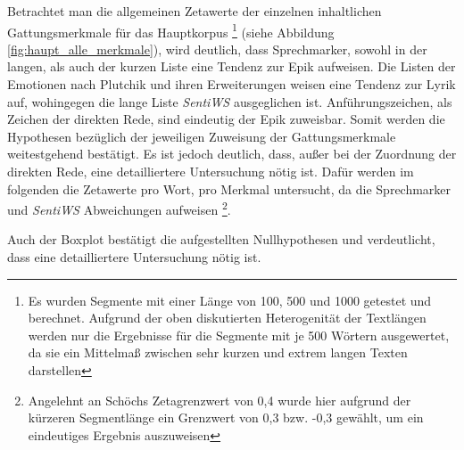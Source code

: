 \documentclass[a4paper,10p]{article}
\begin{document}
Betrachtet man die allgemeinen Zetawerte der einzelnen inhaltlichen Gattungsmerkmale für das Hauptkorpus \footnote{Es wurden Segmente mit einer Länge von 100, 500 und 1000 getestet und berechnet. Aufgrund der oben diskutierten Heterogenität der Textlängen werden nur die Ergebnisse für die Segmente mit je 500 Wörtern ausgewertet, da sie ein Mittelmaß zwischen sehr kurzen und extrem langen Texten darstellen} (siehe Abbildung  \ref{fig:haupt_alle_merkmale}), wird deutlich, dass Sprechmarker, sowohl in der langen, als auch der kurzen Liste eine Tendenz zur Epik aufweisen. Die Listen der Emotionen nach Plutchik und ihren Erweiterungen weisen eine Tendenz zur Lyrik auf, wohingegen die lange Liste \textit{SentiWS} ausgeglichen ist. Anführungszeichen, als Zeichen der direkten Rede, sind eindeutig der Epik zuweisbar. Somit werden die Hypothesen bezüglich der jeweiligen Zuweisung der Gattungsmerkmale weitestgehend bestätigt. Es ist jedoch deutlich, dass, außer bei der Zuordnung der direkten Rede, eine detailliertere Untersuchung nötig ist. Dafür werden im folgenden die Zetawerte pro Wort, pro Merkmal untersucht, da die Sprechmarker und \textit{SentiWS} Abweichungen aufweisen \footnote{Angelehnt an Schöchs Zetagrenzwert von 0,4 wurde hier aufgrund der kürzeren Segmentlänge ein Grenzwert von 0,3 bzw. -0,3 gewählt, um ein eindeutiges Ergebnis auszuweisen}.\par 


Auch der Boxplot bestätigt die aufgestellten Nullhypothesen und verdeutlicht, dass eine detailliertere Untersuchung nötig ist.\\

\newpage
\end{document}
